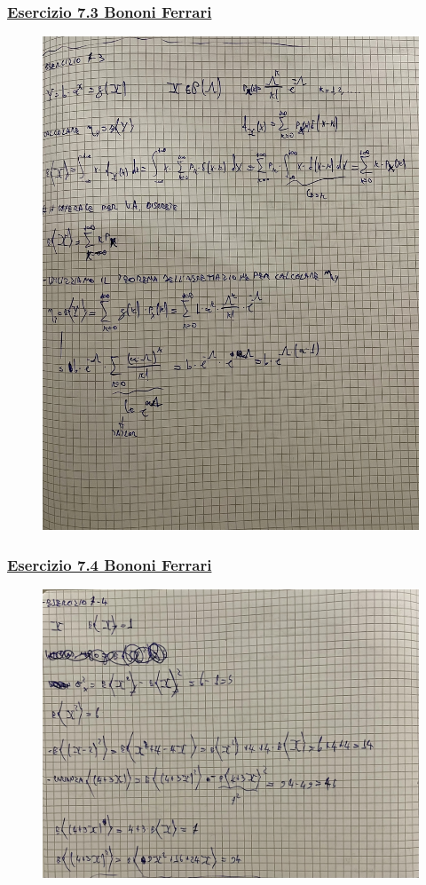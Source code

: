 \documentclass{article}
\begin{document}
\subsubsection{\underline{Esercizio 7.3 Bononi Ferrari}}
\begin{figure}[ht]
\centering
\includegraphics[scale=0.10]{ese/35.jpeg}
\end{figure}
\subsubsection{\underline{Esercizio 7.4 Bononi Ferrari}}
\begin{figure}[ht]
\centering
\includegraphics[scale=0.10]{ese/36.jpeg}
\end{figure}
\end{document}
